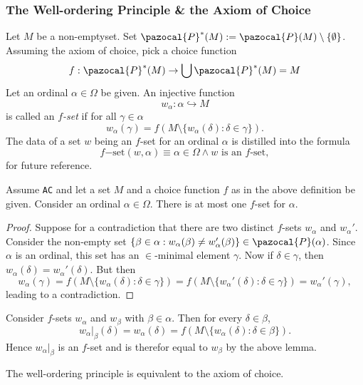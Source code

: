 \subsubsection{The Well-ordering Principle \& the Axiom of Choice}
\begin{definition}
    Let $M$ be a non-emptyset. Set $\pazocal{P}^\ast(M):= \pazocal{P}(M)\setminus\{\emptyset\}$. Assuming the axiom of choice, pick a choice function 
    \begin{gather*}
        f : \pazocal{P}^\ast(M)\rightarrow \bigcup \pazocal{P}^\ast(M) = M 
    \end{gather*}
    Let an ordinal $\alpha\in \Omega$ be given. An injective function 
    $$w_\alpha : \alpha \hookrightarrow M$$
    is called an \textit{$f$-set} if for all $\gamma\in \alpha$
    $$w_\alpha(\gamma) = f(M\setminus\{w_\alpha(\delta):\delta\in \gamma\}).$$
    The data of a set $w$ being an $f$-set for an ordinal $\alpha$ is distilled into the formula 
    $$f\mathrm{-set}(w,\alpha)\equiv \alpha\in \Omega\wedge w \text{ is an }f\text{-set},$$
    for future reference. 
\end{definition}
\begin{lemma}
    Assume \verb|AC| and let a set $M$ and a choice function $f$ as in the above definition be given. Consider an ordinal $\alpha\in \Omega$. There is at most one $f$-set for $\alpha$. 
\end{lemma}
\begin{proof}
    Suppose for a contradiction that there are two distinct $f$-sets $w_\alpha$ and $w_\alpha'$. Consider the non-empty set $\{\beta\in \alpha : w_\alpha(\beta)\neq w_\alpha'(\beta)\}\in \pazocal{P}(\alpha)$. Since $\alpha$ is an ordinal, this set has an $\in$-minimal element $\gamma$. Now if $\delta \in \gamma$, then $w_\alpha(\delta)=w_\alpha'(\delta)$. But then
    $$w_\alpha(\gamma) = f(M\setminus\{w_\alpha(\delta):\delta \in \gamma \}) = f(M\setminus \{w_\alpha'(\delta):\delta\in \gamma\}) = w_\alpha'(\gamma),$$
    leading to a contradiction.    
\end{proof}
\begin{remark}
    Consider $f$-sets $w_\alpha$ and $w_\beta$ with $\beta\in \alpha$. Then for every $\delta\in \beta$, 
    $$\left.w_\alpha\right|_\beta(\delta)=w_\alpha(\delta)=f(M\setminus\{w_\alpha(\delta):\delta \in \beta\}).$$
    Hence $\left.w_\alpha\right|_{\beta}$ is an $f$-set and is therefor equal to $w_\beta$ by the above lemma.
\end{remark}
\begin{theorem}
    The well-ordering principle is equivalent to the axiom of choice. 
\end{theorem}
